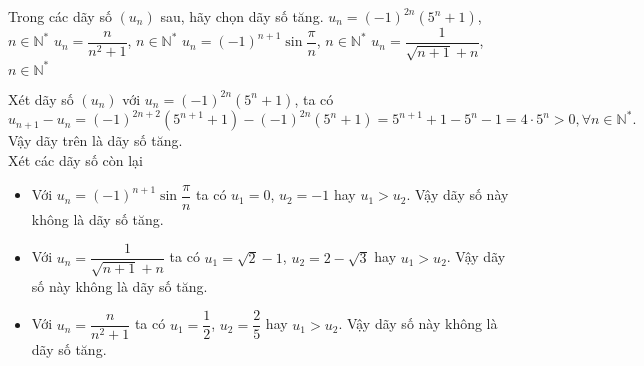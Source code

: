 \begin{ex}%
	Trong các dãy số $(u_{n})$ sau, hãy chọn dãy số tăng.
	\choice
	{\True $u_{n}=(-1)^{2n}(5^{n}+1)$, $n\in \mathbb N^*$}
	{$u_{n}=\dfrac{n}{n^{2}+1}$, $n\in \mathbb N^*$}
	{$u_{n}=(-1)^{n+1}\sin \dfrac{\pi}{n}$, $n\in \mathbb N^*$}
	{$u_{n}=\dfrac{1}{\sqrt{n+1}+n}$, $n\in \mathbb N^*$}
	\loigiai
	{
		Xét dãy số $(u_n)$ với $u_{n}=(-1)^{2n}(5^{n}+1)$, ta có
		\[u_{n+1}-u_n = (-1)^{2n+2}(5^{n+1}+1)-(-1)^{2n}(5^{n}+1) = 5^{n+1}+1-5^n-1 = 4\cdot 5^n>0, \forall n\in\mathbb{N}^\ast.\]
		Vậy dãy trên là dãy số tăng.\\
		Xét các dãy số còn lại
		\begin{itemize}
			\item Với $u_{n}=(-1)^{n+1}\sin \dfrac{\pi}{n}$ ta có $u_1=0$, $u_2=-1$ hay $u_1>u_2$. Vậy dãy số này không là dãy số tăng.
			\item Với $u_{n}=\dfrac{1}{\sqrt{n+1}+n}$ ta có $u_1=\sqrt{2}-1$, $u_2=2-\sqrt{3}$ hay $u_1>u_2$. Vậy dãy số này không là dãy số tăng.
			\item Với $u_{n}=\dfrac{n}{n^{2}+1}$ ta có $u_1=\dfrac{1}{2}$, $u_2=\dfrac{2}{5}$ hay $u_1>u_2$. Vậy dãy số này không là dãy số tăng.
		\end{itemize}
	}
\end{ex}
